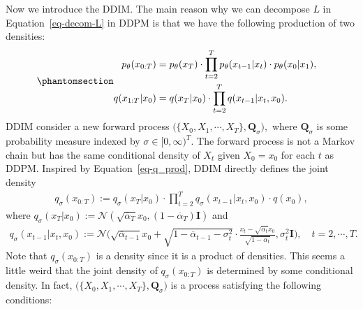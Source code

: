 \documentclass[
]{article}
\theoremstyle{remark}
\begin{document}
Now we introduce the DDIM. The main reason why we can decompose \(L\) in
Equation~\ref{eq-decom-L} in DDPM is that we have the following
production of two densities:
\begin{equation}\phantomsection\label{eq-q_prod}{
\begin{aligned}
  p_{\theta}(x_{0:T}) &= p_{\theta}(x_T) \cdot \prod_{t=2}^T p_{\theta}(x_{t-1}\vert x_t) \cdot  p_{\theta}(x_0\vert x_1) , \cr 
  q(x_{1:T}\vert x_0) &= q(x_T\vert x_0) \cdot \prod_{t=2}^{T} q(x_{t-1} \vert x_{t}, x_0).
\end{aligned}
}\end{equation} DDIM consider a new forward process
\(\bigl( \lbrace X_0,X_1,\cdots,X_T\rbrace, \mathbf{Q}_{\sigma} \bigr),\)
where \(\mathbf{Q}_{\sigma}\) is some probability measure indexed by
\(\sigma\in [0,\infty)^T\). The forward process is not a Markov chain
but has the same conditional density of \(X_{t}\) given \(X_0=x_0\) for
each \(t\) as DDPM. Inspired by Equation~\ref{eq-q_prod}, DDIM directly
defines the joint density \[
\begin{aligned}
  q_{\sigma}(x_{0:T}) := q_{\sigma}(x_T\vert x_0) \cdot \prod_{t=2}^T q_{\sigma}(x_{t-1}\vert x_t, x_0) \cdot q(x_0),
\end{aligned}
\] where
\(q_{\sigma}(x_T\vert x_0):=\mathcal{N}(\sqrt{\overline{\alpha}_T}x_0,(1-\overline{\alpha}_T)\mathbf{I})\)
and \[
\begin{aligned}
  q_{\sigma} (x_{t-1}\vert x_t,x_0) := \mathcal{N}\biggl( \sqrt{\overline{\alpha}_{t-1}}x_0 + \sqrt{1-\overline{\alpha}_{t-1} - \sigma_t^2} \cdot \frac{x_t-\sqrt{\overline{\alpha}_t}x_0}{\sqrt{1-\overline{\alpha}_t}} , \sigma_t^2 \mathbf{I} \biggr), \quad t=2,\cdots, T.
\end{aligned}
\] Note that \(q_{\sigma}(x_{0:T})\) is a density since it is a product
of densities. This seems a little weird that the joint density of
\(q_{\sigma}(x_{0:T})\) is determined by some conditional density. In
fact,
\(\bigl(\lbrace X_0,X_1,\cdots,X_T \rbrace,\mathbf{Q}_{\sigma}\bigr)\)
is a process satisfying the following conditions:
\end{document}
